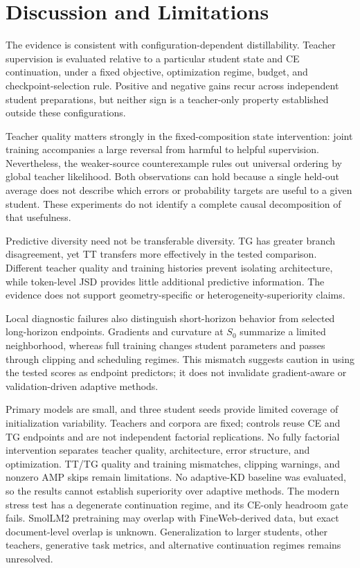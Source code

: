 \section{Discussion and Limitations}
\label{sec:discussion}

The evidence is consistent with configuration-dependent distillability. Teacher supervision is evaluated relative to a particular student state and CE continuation, under a fixed objective, optimization regime, budget, and checkpoint-selection rule. Positive and negative gains recur across independent student preparations, but neither sign is a teacher-only property established outside these configurations.

Teacher quality matters strongly in the fixed-composition state intervention: joint training accompanies a large reversal from harmful to helpful supervision. Nevertheless, the weaker-source counterexample rules out universal ordering by global teacher likelihood. Both observations can hold because a single held-out average does not describe which errors or probability targets are useful to a given student. These experiments do not identify a complete causal decomposition of that usefulness.

Predictive diversity need not be transferable diversity. TG has greater branch disagreement, yet TT transfers more effectively in the tested comparison. Different teacher quality and training histories prevent isolating architecture, while token-level JSD provides little additional predictive information. The evidence does not support geometry-specific or heterogeneity-superiority claims.

Local diagnostic failures also distinguish short-horizon behavior from selected long-horizon endpoints. Gradients and curvature at $S_0$ summarize a limited neighborhood, whereas full training changes student parameters and passes through clipping and scheduling regimes. This mismatch suggests caution in using the tested scores as endpoint predictors; it does not invalidate gradient-aware or validation-driven adaptive methods.

Primary models are small, and three student seeds provide limited coverage of initialization variability. Teachers and corpora are fixed; controls reuse CE and TG endpoints and are not independent factorial replications. No fully factorial intervention separates teacher quality, architecture, error structure, and optimization. TT/TG quality and training mismatches, clipping warnings, and nonzero AMP skips remain limitations. No adaptive-KD baseline was evaluated, so the results cannot establish superiority over adaptive methods. The modern stress test has a degenerate continuation regime, and its CE-only headroom gate fails. SmolLM2 pretraining may overlap with FineWeb-derived data, but exact document-level overlap is unknown. Generalization to larger students, other teachers, generative task metrics, and alternative continuation regimes remains unresolved.
